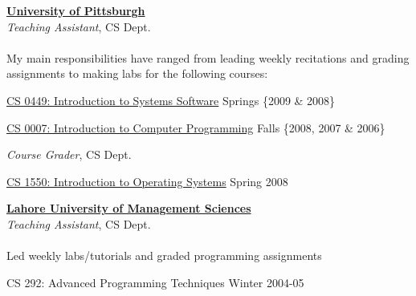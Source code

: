 \documentclass[10pt]{article}
\newenvironment{innerlist}[1][\enskip\textbullet]%
        {\begin{compactitem}[#1]}{\end{compactitem}}
\begin{document}
\href{http://www.pitt.edu}{\textbf{University of Pittsburgh}} \\
\textit{Teaching Assistant}, CS Dept. \\
\\
My main responsibilities have ranged from leading weekly recitations
and grading assignments to making labs for the following courses:

\begin{innerlist}
\item \href{http://www.cs.pitt.edu/undergrad/courses/cs0449.php}
           {CS 0449: Introduction to Systems Software}%
			\hfill {Springs \{2009 \& 2008\}}
\item \href{http://www.cs.pitt.edu/undergrad/courses/cs0007.php}
           {CS 0007: Introduction to Computer Programming}%
			\hfill {Falls \{2008, 2007 \& 2006\}} \\
\end{innerlist}

\textit{Course Grader}, CS Dept.
\begin{innerlist}
\item \href{http://www.cs.pitt.edu/undergrad/courses/cs1550.php}
           {CS 1550: Introduction to Operating Systems}%
			\hfill {Spring 2008} \\
\end{innerlist}
\href{http://www.lums.edu.pk}{\textbf{Lahore University of Management Sciences}} \\
\textit{Teaching Assistant}, CS Dept. \\
\\
Led weekly labs/tutorials and graded programming assignments 

\begin{innerlist}
\item {CS 292: Advanced Programming Techniques}%
			\hfill {Winter 2004-05}
\end{innerlist}
\end{document}
